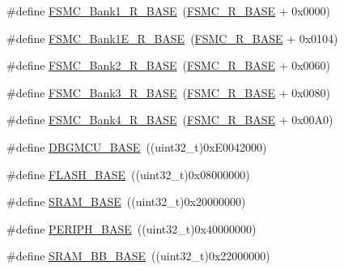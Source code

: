 \begin{DoxyCompactItemize}
\item 
\#define \hyperlink{group___peripheral__memory__map_gad196fe6f5e4041b201d14f43508c06d2}{F\-S\-M\-C\-\_\-\-Bank1\-\_\-\-R\-\_\-\-B\-A\-S\-E}~(\hyperlink{group___peripheral__memory__map_gaddf0e199dccba83272b20c9fb4d3aaed}{F\-S\-M\-C\-\_\-\-R\-\_\-\-B\-A\-S\-E} + 0x0000)
\item 
\#define \hyperlink{group___peripheral__memory__map_gaea182589c84aee30b7f735474d8774e2}{F\-S\-M\-C\-\_\-\-Bank1\-E\-\_\-\-R\-\_\-\-B\-A\-S\-E}~(\hyperlink{group___peripheral__memory__map_gaddf0e199dccba83272b20c9fb4d3aaed}{F\-S\-M\-C\-\_\-\-R\-\_\-\-B\-A\-S\-E} + 0x0104)
\item 
\#define \hyperlink{group___peripheral__memory__map_ga3cb46d62f4f6458e186a5a4c753e4918}{F\-S\-M\-C\-\_\-\-Bank2\-\_\-\-R\-\_\-\-B\-A\-S\-E}~(\hyperlink{group___peripheral__memory__map_gaddf0e199dccba83272b20c9fb4d3aaed}{F\-S\-M\-C\-\_\-\-R\-\_\-\-B\-A\-S\-E} + 0x0060)
\item 
\#define \hyperlink{group___peripheral__memory__map_gacf056152c9e5aefcc67db78d1302c0d7}{F\-S\-M\-C\-\_\-\-Bank3\-\_\-\-R\-\_\-\-B\-A\-S\-E}~(\hyperlink{group___peripheral__memory__map_gaddf0e199dccba83272b20c9fb4d3aaed}{F\-S\-M\-C\-\_\-\-R\-\_\-\-B\-A\-S\-E} + 0x0080)
\item 
\#define \hyperlink{group___peripheral__memory__map_gaf9e5417133160b0bdd0498d982acec19}{F\-S\-M\-C\-\_\-\-Bank4\-\_\-\-R\-\_\-\-B\-A\-S\-E}~(\hyperlink{group___peripheral__memory__map_gaddf0e199dccba83272b20c9fb4d3aaed}{F\-S\-M\-C\-\_\-\-R\-\_\-\-B\-A\-S\-E} + 0x00\-A0)
\item 
\#define \hyperlink{group___peripheral__memory__map_ga4adaf4fd82ccc3a538f1f27a70cdbbef}{D\-B\-G\-M\-C\-U\-\_\-\-B\-A\-S\-E}~((uint32\-\_\-t)0x\-E0042000)
\item 
\#define \hyperlink{group___peripheral__memory__map_ga23a9099a5f8fc9c6e253c0eecb2be8db}{F\-L\-A\-S\-H\-\_\-\-B\-A\-S\-E}~((uint32\-\_\-t)0x08000000)
\item 
\#define \hyperlink{group___peripheral__memory__map_ga05e8f3d2e5868754a7cd88614955aecc}{S\-R\-A\-M\-\_\-\-B\-A\-S\-E}~((uint32\-\_\-t)0x20000000)
\item 
\#define \hyperlink{group___peripheral__memory__map_ga9171f49478fa86d932f89e78e73b88b0}{P\-E\-R\-I\-P\-H\-\_\-\-B\-A\-S\-E}~((uint32\-\_\-t)0x40000000)
\item 
\#define \hyperlink{group___peripheral__memory__map_gad3548b6e2f017f39d399358f3ac98454}{S\-R\-A\-M\-\_\-\-B\-B\-\_\-\-B\-A\-S\-E}~((uint32\-\_\-t)0x22000000)
\item 

\end{DoxyCompactItemize}
